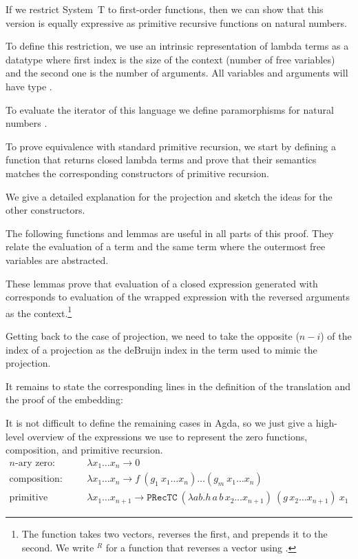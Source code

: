 \documentclass{jfp}
\newcommand{\xs}[1]{x_1\dots x_{#1}}
\begin{document}
If we restrict System~T to first-order functions, then we can show
that this version is equally expressive as primitive recursive
functions on natural numbers. 

To define this restriction, we use an intrinsic representation of
lambda terms as a datatype  where first index is the size
of the context (number of free variables) and the second one is the
number of arguments. All variables and arguments will have type \ANat.


To evaluate the iterator of this language we define paramorphisms for
natural numbers \cite{DBLP:conf/fpca/MeijerFP91}. 


\para
\evalST


To prove equivalence with standard primitive recursion, we start by defining a
function that returns closed lambda terms and prove that their
semantics matches the corresponding constructors of primitive recursion.


\prToStSig
\embedPRSTSoundSig


We give a detailed explanation for the projection and sketch the ideas for the other constructors.

The following functions and lemmas are useful in all parts of this
proof. They relate the evaluation of a term and the same term where
the outermost free variables are abstracted.

\prepLambdas



These lemmas prove that evaluation of a closed expression generated with
 corresponds to evaluation of the wrapped
expression with the reversed arguments as the context.\footnote{
The function  takes two vectors, reverses the first,
and prepends it to the second. We write $^R$ for a function that
reverses a vector using .
}

Getting back to the case of projection, we need to take the opposite ($n - i$) of the index of a
projection as the deBruijn index in the term used to mimic the projection.

\mkProj

\lookupOpRev

It remains to state the corresponding lines in the definition of the
translation and the proof of the embedding:
\prToStProj
\embedPRSTSoundProj

It is not difficult to define the remaining cases in Agda, so we just
give a high-level overview of the expressions we use to represent the zero functions, composition, and primitive recursion.
\begin{align*}
  \text{$n$-ary zero: } & \lambda \xs{n} \rightarrow 0 \\
  \text{composition: } & \lambda \xs{n} \rightarrow  f \ (g_1 \ \xs{n})
                        \dots (g_m \ \xs{n}) \\
  \text{primitive recursion: } & \lambda \xs{n+1} \rightarrow \mathtt{PRecTC} \ (\lambda a b . h \, a \, b \, x_2 \dots x_{n+1}) \ (g \, x_2 \dots x_{n+1}) \ x_1 
\end{align*}
\end{document}
